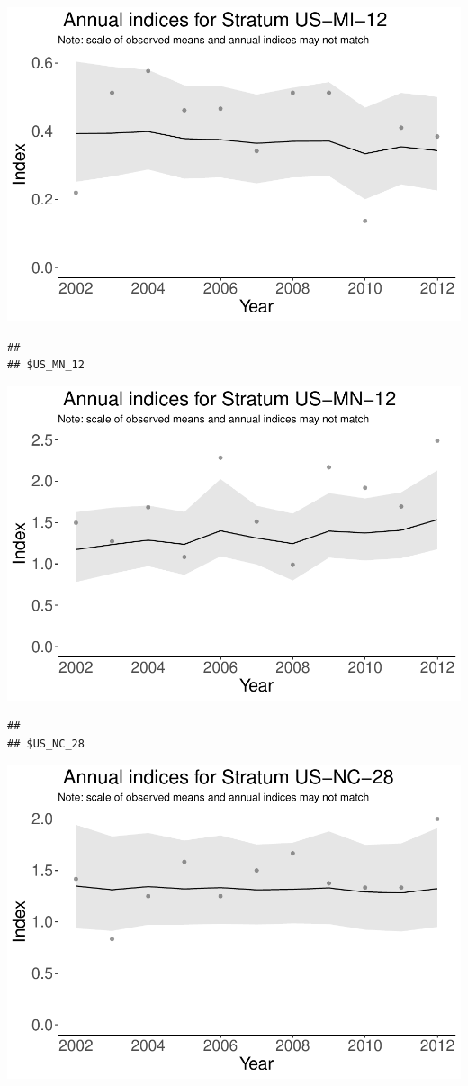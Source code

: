 \documentclass[]{article}
\begin{document}
\includegraphics{index_files/figure-latex/unnamed-chunk-7-20.pdf}

\begin{verbatim}
## 
## $US_MN_12
\end{verbatim}

\includegraphics{index_files/figure-latex/unnamed-chunk-7-21.pdf}

\begin{verbatim}
## 
## $US_NC_28
\end{verbatim}

\includegraphics{index_files/figure-latex/unnamed-chunk-7-22.pdf}
\end{document}
